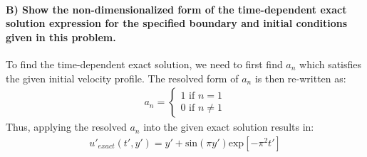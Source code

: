 \documentclass[letterpaper,10pt,english]{sphinxmanual}
\begin{document}
\paragraph{B) Show the non-dimensionalized form of the time-dependent exact solution expression for the specified boundary and initial conditions given in this problem.}
\label{\detokenize{cases/results:b-show-the-non-dimensionalized-form-of-the-time-dependent-exact-solution-expression-for-the-specified-boundary-and-initial-conditions-given-in-this-problem}}
To find the time-dependent exact solution, we need to first find \(a_{n}\) which satisfies the given initial velocity profile. The resolved form of \(a_{n}\) is then re-written as:
\begin{equation*}
\begin{split}a_{n} = \left\{\begin{matrix} 1 \text{  if } n = 1 \\ 0 \text{  if } n \neq  1 \end{matrix}\right.\end{split}
\end{equation*}
Thus, applying the resolved \(a_{n}\) into the given exact solution results in:
\begin{equation*}
\begin{split}u'_{exact}(t',y') = y' + \text{sin}(\pi y') \text{exp}[-\pi^{2}t']\end{split}
\end{equation*}
\end{document}
